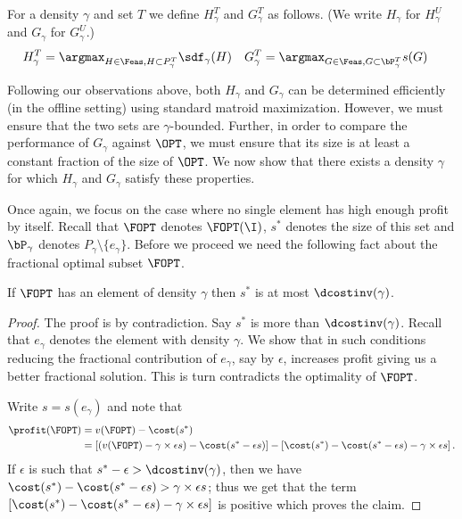 \noindent
For a density $\gamma$ and set $T$ we define $H_\gamma^T$ and $G_\gamma^T$ as follows. (We write $H_\gamma$ for $H_\gamma^U$ and $G_\gamma$ for $G_\gamma^U$.)
 \begin{align*}
    H_\gamma^T &= \argmax_{H \in \Feas, H \subset P_\gamma^T} \sdf_{\gamma}(H)
&
    G_\gamma^T &= \argmax_{G \in \Feas, G \subset
      \bP_\gamma^T } s(G) 
\end{align*}

Following our observations above, both $H_\gamma$ and $G_\gamma$ can
be determined efficiently (in the offline setting) using standard
matroid maximization. However, we must ensure that the two sets are
$\gamma$-bounded. Further, in order to compare the performance of
$G_{\gamma}$ against $\OPT$, we must ensure that its size is at least
a constant fraction of the size of $\OPT$. We now show that there
exists a density $\gamma$ for which $H_\gamma$ and $G_\gamma$ satisfy
these properties.

Once again, we focus on the case where no single element has high enough profit by itself. Recall that $\FOPT$ denotes $\FOPT(\I)$, $s^*$ denotes the size of this set and $\bP_\gamma$ denotes $P_\gamma \setminus \{ e_\gamma \}$. Before we proceed we need the following fact about the fractional
optimal subset $\FOPT$. 

\begin{lemma}
\label{lem:opt_frac}
 If $\FOPT$ has an element of density $\gamma$ then $s^*$ is at most
 $\dcostinv(\gamma)$.
\end{lemma}
\begin{proof}
The proof is by contradiction. Say $s^*$ is more than
$\dcostinv(\gamma)$. Recall that $e_\gamma$ denotes the element 
with density $\gamma$. We show that in such conditions reducing the
fractional contribution of $e_\gamma$, say by $\epsilon$, increases profit
giving us a better fractional solution. This is turn contradicts the
optimality of $\FOPT$.

Write $s = s(e_\gamma)$ and note that
\begin{align*} 
\profit(\FOPT) & = v(\FOPT) - \cost(s^*) \\ & = \left[ \left( v(\FOPT)
  - \gamma \times \epsilon s \right) - \cost(s^* - \epsilon s )
  \right] - \left[ \cost(s^*) - \cost(s^* - \epsilon s ) - \gamma
  \times \epsilon s \right].
\end{align*}
If $\epsilon$ is such that $s^* -\epsilon > \dcostinv(\gamma) $, then we have $ \cost(s^*) - \cost(s^* -
\epsilon s ) > \gamma \times \epsilon s $; thus we get that the term 
$ \left[ \cost(s^*) - \cost(s^* - \epsilon s ) - \gamma \times \epsilon s
  \right]$ is positive which proves the claim.
\end{proof}


